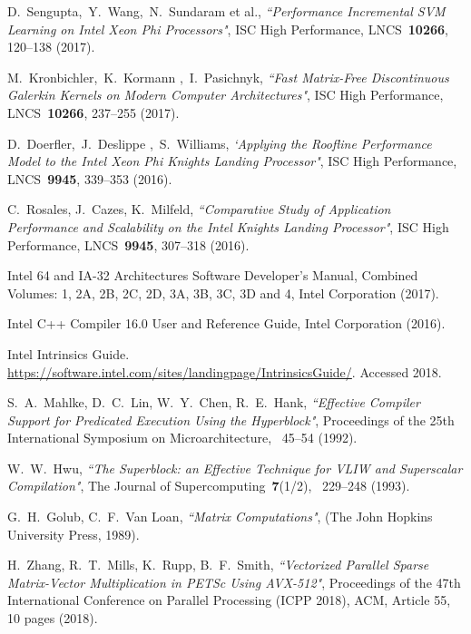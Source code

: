 \documentclass[
11pt,%
tightenlines,%
twoside,%
onecolumn,%
nofloats,%
nobibnotes,%
nofootinbib,%
superscriptaddress,%
noshowpacs,%
centertags]%
{revtex4}
\begin{document}
\begin{thebibliography}{99}
D.~Sengupta,~Y.~Wang,~N.~Sundaram et al., {\it ``Performance Incremental SVM Learning on Intel Xeon Phi Processors"}, ISC High Performance, LNCS~{\bf 10266}, 120--138 (2017).

M.~Kronbichler,~K.~Kormann ,~I.~Pasichnyk, {\it ``Fast Matrix-Free Discontinuous Galerkin Kernels on Modern Computer Architectures"}, ISC High Performance, LNCS~{\bf 10266}, 237--255 (2017).

D.~Doerfler,~J.~Deslippe ,~S.~Williams, {\it `Applying the Roofline Performance Model to the Intel Xeon Phi Knights Landing Processor"}, ISC High Performance, LNCS~{\bf 9945}, 339--353 (2016).

C.~Rosales, J.~Cazes, K.~Milfeld, {\it ``Comparative Study of Application Performance and Scalability on the Intel Knights Landing Processor"}, ISC High Performance, LNCS~{\bf 9945}, 307--318 (2016).


Intel 64 and IA-32 Architectures Software Developer's Manual, Combined Volumes: 1, 2A, 2B, 2C, 2D, 3A, 3B, 3C, 3D and 4, Intel Corporation (2017).

Intel C++ Compiler 16.0 User and Reference Guide, Intel Corporation (2016).

Intel Intrinsics Guide. \url{https://software.intel.com/sites/landingpage/IntrinsicsGuide/}. Accessed 2018.

S.~A.~Mahlke, D.~C.~Lin, W.~Y.~Chen, R.~E.~Hank, {\it ``Effective Compiler Support for Predicated Execution Using the Hyperblock"}, Proceedings of the 25th International Symposium on Microarchitecture, ~45--54 (1992).

W.~W.~Hwu, {\it ``The Superblock: an Effective Technique for VLIW and Superscalar Compilation"}, The Journal of Supercomputing~{\bf 7}(1/2), ~229--248 (1993).

G.~H.~Golub, C.~F.~Van Loan, {\it ``Matrix Computations"}, (The John Hopkins University Press, 1989).

H.~Zhang, R.~T.~Mills, K.~Rupp, B.~F.~Smith, {\it ``Vectorized Parallel Sparse Matrix-Vector Multiplication in PETSc Using AVX-512"}, Proceedings of the 47th International Conference on Parallel Processing (ICPP 2018), ACM, Article 55, 10 pages (2018).


\end{thebibliography}
\end{document}
